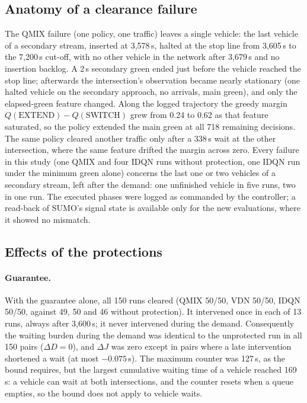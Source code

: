 \documentclass[11pt]{article}
\begin{document}
\subsection{Anatomy of a clearance failure}
The QMIX failure (one policy, one traffic) leaves a single vehicle: the last vehicle of a secondary stream,
inserted at 3{,}578\,s, halted at the stop line from 3{,}605\,s to the 7{,}200\,s cut-off, with no other
vehicle in the network after 3{,}679\,s and no insertion backlog. A 2\,s secondary green ended just before the
vehicle reached the stop line; afterwards the intersection's observation became nearly stationary (one halted
vehicle on the secondary approach, no arrivals, main green), and only the elapsed-green feature changed.
Along the logged trajectory the greedy margin $Q(\text{EXTEND})-Q(\text{SWITCH})$ grew from 0.24 to 0.62 as
that feature saturated, so the policy extended the main green at all 718 remaining decisions. The same policy
cleared another traffic only after a 338\,s wait at the other intersection, where the same feature drifted
the margin across zero. Every failure in this study (one QMIX and four IDQN runs without protection, one
IDQN run under the minimum green alone) concerns the last one or two vehicles of a secondary stream, left after
the demand: one unfinished vehicle in five runs, two in one run.
The executed phases were logged as commanded by the controller; a read-back of SUMO's signal state is
available only for the new evaluations, where it showed no mismatch.

\subsection{Effects of the protections}\label{sec:protections}
\paragraph{Guarantee.} With the guarantee alone, all 150 runs cleared (QMIX 50/50, VDN 50/50, IDQN 50/50,
against 49, 50 and 46 without protection). It intervened once in each of 13 runs, always after 3{,}600\,s;
it never intervened during the demand. Consequently the waiting burden during the demand was identical to the
unprotected run in all 150 pairs ($\Delta D=0$), and $\Delta J$ was zero except in pairs where a late
intervention shortened a wait (at most $-0.075$\,s). The maximum counter was 127\,s, as the bound requires,
but the largest cumulative waiting time of a vehicle reached 169\,s: a vehicle can wait at both intersections,
and the counter resets when a queue empties, so the bound does not apply to vehicle waits.
\end{document}
